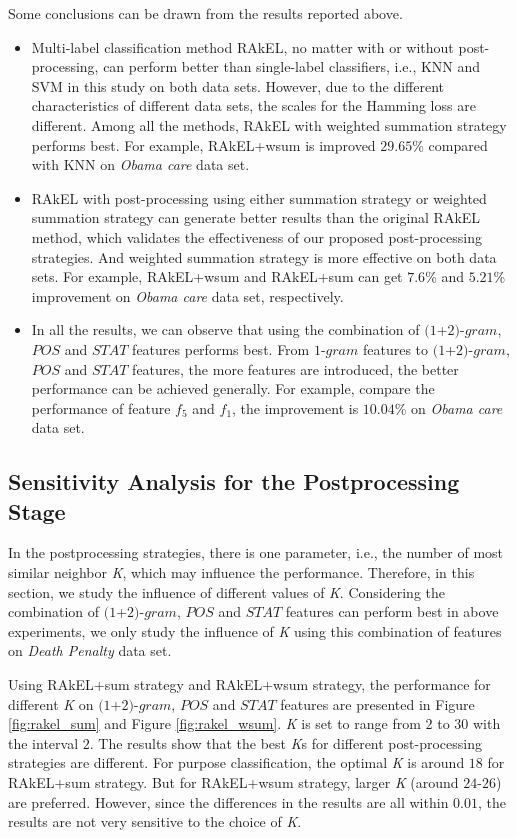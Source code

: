 \documentclass[letterpaper]{article}
\begin{document}
Some conclusions can be drawn from the results reported above.
\begin{itemize}
    \item Multi-label classification method RAkEL, no matter with or without post-processing, can perform better than single-label classifiers, i.e., KNN and SVM in this study on both data sets. However, due to the different characteristics of different data sets, the scales for the Hamming loss are different. Among all the methods, RAkEL with weighted summation strategy performs best. For example, RAkEL+wsum is improved $29.65$\% compared with KNN on \textit{Obama care} data set.
    \item RAkEL with post-processing using either summation strategy or weighted summation strategy can generate better results than the original RAkEL method, which validates the effectiveness of our proposed post-processing strategies. And weighted summation strategy is more effective on both data sets. For example, RAkEL+wsum and RAkEL+sum can get $7.6$\% and $5.21$\% improvement on \textit{Obama care} data set, respectively.
    \item In all the results, we can observe that using the combination of $(1$+$2)$-$gram$, $POS$ and $STAT$ features performs best. From $1$-$gram$ features to $(1$+$2)$-$gram$, $POS$ and $STAT$ features, the more features are introduced, the better performance can be achieved generally. For example, compare the performance of feature $f_5$ and $f_1$, the improvement is $10.04$\% on \textit{Obama care} data set.
\end{itemize}

\subsection{Sensitivity Analysis for the Postprocessing Stage}
\label{subsec:sensitivity}
In the postprocessing strategies, there is one parameter, i.e., the number of most similar neighbor \textit{K}, which may influence the performance. Therefore, in this section, we study the influence of different values of \textit{K}. Considering the combination of $(1$+$2)$-$gram$, $POS$ and $STAT$ features can perform best in above experiments, we only study the influence of \textit{K} using this combination of features on \textit{Death Penalty} data set.

Using RAkEL+sum strategy and RAkEL+wsum strategy, the performance for different \textit{K} on $(1$+$2)$-$gram$, $POS$ and $STAT$ features are presented in Figure \ref{fig:rakel_sum} and Figure \ref{fig:rakel_wsum}. \textit{K} is set to range from $2$ to $30$ with the interval $2$. The results show that the best \textit{K}s for different post-processing strategies are different. For purpose classification, the optimal \textit{K} is around $18$ for RAkEL+sum strategy. But for RAkEL+wsum strategy, larger \textit{K} (around $24$-$26$) are preferred. However, since the differences in the results are all within $0.01$, the results are not very sensitive to the choice of \textit{K}.
\end{document}
